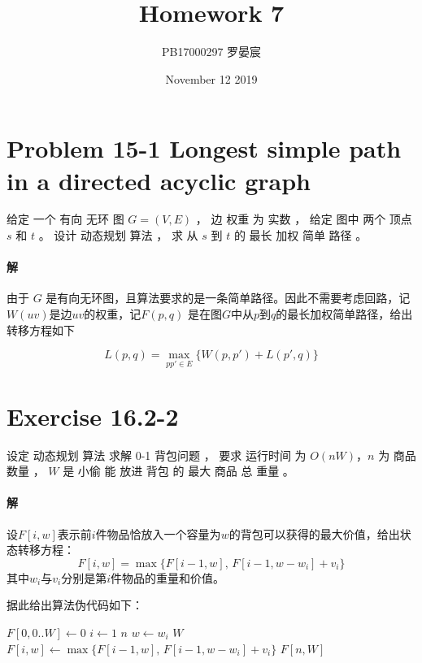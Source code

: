 \documentclass{article}
\title{Homework 7}
\author{PB17000297 罗晏宸}
\date{November 12 2019}
\begin{document}
\maketitle

\section{Problem 15-1 Longest simple path in a directed acyclic graph}
给定 一个 有向 无环 图 $G = (V,E)$ ， 边 权重 为 实数 ， 给定 图中 两个 顶点 $s$ 和 $t$ 。 设计 动态规划 算法 ， 求 从 $s$ 到 $t$ 的 最长 加权 简单 路径 。

\paragraph{解}

由于 $G$ 是有向无环图，且算法要求的是一条简单路径。因此不需要考虑回路，记$W(uv)$是边$uv$的权重，记$F(p,q)$ 是在图$G$中从$p$到$q$的最长加权简单路径，给出转移方程如下

\begin{equation}
	L(p,q) = \max_{pp' \in E}{ \{ W(p,p') + L(p',q)\} }
\end{equation}

\section{Exercise 16.2-2}
设定 动态规划 算法 求解 0-1 背包问题 ， 要求 运行时间 为 $O(nW)$，$n$ 为 商品 数量 ， $W$ 是 小偷 能 放进 背包 的 最大 商品 总 重量 。

\paragraph{解}
设$F[i,w]$表示前$i$件物品恰放入一个容量为$w$的背包可以获得的最大价值，给出状态转移方程：
\begin{equation}
	F[i,w] = \max{\{ F[i-1,w],\,F[i-1,w-w_i] + v_i \}}
\end{equation}
其中$w_i$与$v_i$分别是第$i$件物品的重量和价值。
\par
据此给出算法伪代码如下：
\begin{codebox}
	\li $F[0, 0..W] \gets 0$
	\li \For $i \gets 1$ \To $n$
		\Do
	\li 	\For $w \gets w_i$ \To $W$
			\Do
	\li			$F[i,w] \gets \max{\{ F[i-1,w],\,F[i-1,w-w_i] + v_i \}}$
			\End
		\End
	\li \Return $F[n,W]$
\end{codebox}
\end{document}
